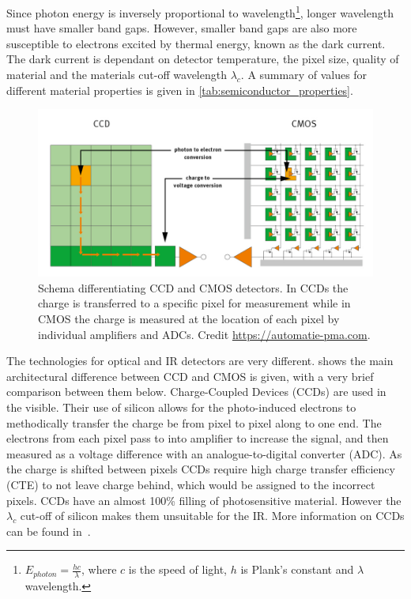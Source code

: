 Since photon energy is inversely proportional to wavelength\footnote{\(E_{photon} = \frac{h c}{\lambda}\), where $c$ is the speed of light, $h$ is Plank's constant and $\lambda$ wavelength.}, longer wavelength must have smaller band gaps.
However, smaller band gaps are also more susceptible to electrons excited by thermal energy, known as the dark current.
The dark current is dependant on detector temperature, the pixel size, quality of material and the materials cut-off wavelength $\lambda_c$.
A summary of values for different material properties is given in \cref{tab:semiconductor_properties}.



\begin{figure}
    \centering
    \includegraphics[width=0.8\linewidth]{figures/spectroscopy/CMOS-vs-CCD-schema}
    \caption{Schema differentiating {CCD} and {CMOS} detectors.
In {CCDs} the charge is transferred to a specific pixel for measurement while in {CMOS} the charge is measured at the location of each pixel by individual amplifiers and {ADCs}.
Credit \href{https://automatie-pma.com/pma/innovatie-en-technologie-pma/cmos-vervangt-steeds-meer-hoogwaardige-ccd-toepassingen/}{https://automatie-pma.com}.}
    \label{fig:cmos-vs-ccd-schema}
\end{figure}

The technologies for optical and {IR} detectors are very different.
 shows the main architectural difference between {CCD} and {CMOS} is given, with a very brief comparison between them below.
Charge-Coupled Devices ({CCDs}) are used in the visible.
Their use of silicon allows for the photo-induced electrons to methodically transfer the charge be from pixel to pixel along to one end.
The electrons from each pixel pass to into amplifier to increase the signal, and then measured as a voltage difference with an analogue-to-digital converter (ADC).
As the charge is shifted between pixels {CCDs} require high charge transfer efficiency (CTE) to not leave charge behind, which would be assigned to the incorrect pixels.
{CCDs} have an almost 100\% filling of photosensitive material.
However the $\lambda_c$ cut-off of silicon makes them unsuitable for the {IR}.
More information on {CCDs} can be found in~\citep{howell_handbook_2000}.

